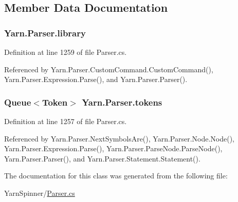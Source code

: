 \subsection{Member Data Documentation}
\hypertarget{a00143_a1313951b09177a1c83b6cf035139197a}{
\subsubsection[{library}]{ Yarn.\-Parser.\-library\hspace{0.3cm}{\ttfamily [private]}}}\label{a00143_a1313951b09177a1c83b6cf035139197a}


Definition at line 1259 of file Parser.\-cs.



Referenced by Yarn.\-Parser.\-Custom\-Command.\-Custom\-Command(), Yarn.\-Parser.\-Expression.\-Parse(), and Yarn.\-Parser.\-Parser().

\hypertarget{a00143_a1a4de646937057988b59d2ff8035eae3}{
\subsubsection[{tokens}]{\setlength{\rightskip}{0pt plus 5cm}Queue$<${\bf Token}$>$ Yarn.\-Parser.\-tokens\hspace{0.3cm}{\ttfamily [private]}}}\label{a00143_a1a4de646937057988b59d2ff8035eae3}


Definition at line 1257 of file Parser.\-cs.



Referenced by Yarn.\-Parser.\-Next\-Symbols\-Are(), Yarn.\-Parser.\-Node.\-Node(), Yarn.\-Parser.\-Expression.\-Parse(), Yarn.\-Parser.\-Parse\-Node.\-Parse\-Node(), Yarn.\-Parser.\-Parser(), and Yarn.\-Parser.\-Statement.\-Statement().



The documentation for this class was generated from the following file\-:\begin{DoxyCompactItemize}
\item 
Yarn\-Spinner/\hyperlink{a00301}{Parser.\-cs}\end{DoxyCompactItemize}
